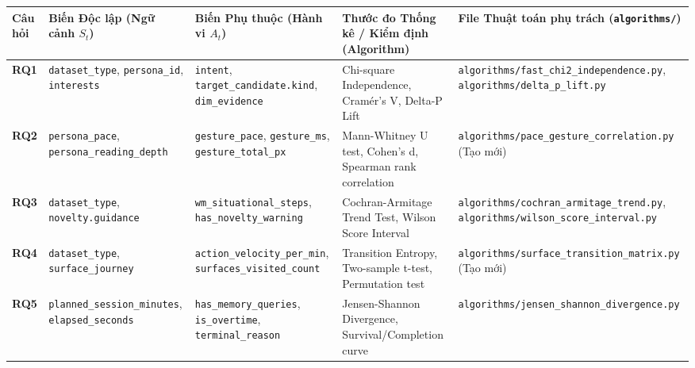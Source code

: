 \documentclass[11pt]{article}
\newcounter{none}
\begin{document}
{\def\LTcaptype{none} %
\begin{longtable}[]{@{}
  >{\raggedright\arraybackslash}p{}
  >{\raggedright\arraybackslash}p{}
  >{\raggedright\arraybackslash}p{}
  >{\raggedright\arraybackslash}p{}
  >{\raggedright\arraybackslash}p{}@{}}
\toprule\noalign{}
\begin{minipage}[b]{\linewidth}\raggedright
Câu hỏi
\end{minipage} & \begin{minipage}[b]{\linewidth}\raggedright
Biến Độc lập (Ngữ cảnh \(S_t\))
\end{minipage} & \begin{minipage}[b]{\linewidth}\raggedright
Biến Phụ thuộc (Hành vi \(A_t\))
\end{minipage} & \begin{minipage}[b]{\linewidth}\raggedright
Thước đo Thống kê / Kiểm định (Algorithm)
\end{minipage} & \begin{minipage}[b]{\linewidth}\raggedright
File Thuật toán phụ trách (\texttt{algorithms/})
\end{minipage} \\
\midrule\noalign{}
\endhead
\bottomrule\noalign{}
\endlastfoot
\textbf{RQ1} & \texttt{dataset\_type}, \texttt{persona\_id},
\texttt{interests} & \texttt{intent}, \texttt{target\_candidate.kind},
\texttt{dim\_evidence} & Chi-square Independence, Cramér's V, Delta-P
Lift & \texttt{algorithms/fast\_chi2\_independence.py},
\texttt{algorithms/delta\_p\_lift.py} \\
\textbf{RQ2} & \texttt{persona\_pace}, \texttt{persona\_reading\_depth}
& \texttt{gesture\_pace}, \texttt{gesture\_ms},
\texttt{gesture\_total\_px} & Mann-Whitney U test, Cohen's d, Spearman
rank correlation & \texttt{algorithms/pace\_gesture\_correlation.py}
(Tạo mới) \\
\textbf{RQ3} & \texttt{dataset\_type}, \texttt{novelty.guidance} &
\texttt{wm\_situational\_steps}, \texttt{has\_novelty\_warning} &
Cochran-Armitage Trend Test, Wilson Score Interval &
\texttt{algorithms/cochran\_armitage\_trend.py},
\texttt{algorithms/wilson\_score\_interval.py} \\
\textbf{RQ4} & \texttt{dataset\_type}, \texttt{surface\_journey} &
\texttt{action\_velocity\_per\_min}, \texttt{surfaces\_visited\_count} &
Transition Entropy, Two-sample t-test, Permutation test &
\texttt{algorithms/surface\_transition\_matrix.py} (Tạo mới) \\
\textbf{RQ5} & \texttt{planned\_session\_minutes},
\texttt{elapsed\_seconds} & \texttt{has\_memory\_queries},
\texttt{is\_overtime}, \texttt{terminal\_reason} & Jensen-Shannon
Divergence, Survival/Completion curve &
\texttt{algorithms/jensen\_shannon\_divergence.py} \\
\end{longtable}
}
\end{document}
